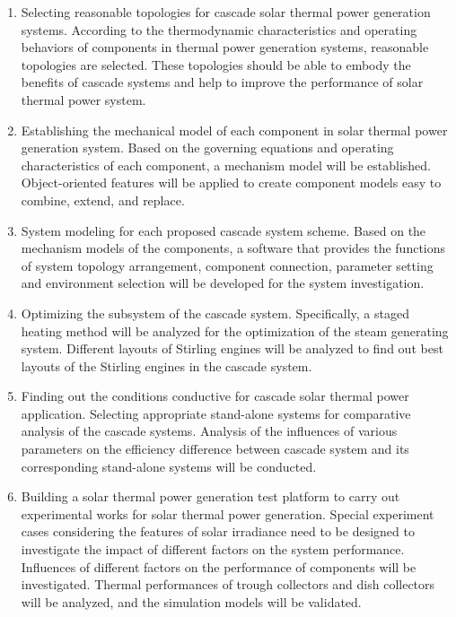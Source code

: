 \begin{enumerate}[label=(\arabic*)]
	
	\item Selecting reasonable topologies for cascade solar thermal power generation systems. According to the thermodynamic characteristics and operating behaviors of components in thermal power generation systems, reasonable topologies are selected. These topologies should be able to embody the benefits of cascade systems and help to improve the performance of solar thermal power system. 

	\item Establishing the mechanical model of each component in solar thermal power generation system. Based on the governing equations and operating characteristics of each component, a mechanism model will be established. Object-oriented features will be applied to create component models easy to combine, extend, and replace.

	\item System modeling for each proposed cascade system scheme. Based on the mechanism models of the components, a software that provides the functions of system topology arrangement, component connection, parameter setting and environment selection will be developed for the system investigation.

	\item Optimizing the subsystem of the cascade system. Specifically, a staged heating method will be analyzed for the optimization of the steam generating system. Different layouts of Stirling engines will be analyzed to find out best layouts of the Stirling engines in the cascade system.

	\item Finding out the conditions conductive for cascade solar thermal power application.  Selecting appropriate stand-alone systems for comparative analysis of the cascade systems. Analysis of the influences of various parameters on the efficiency difference between cascade system and its corresponding stand-alone systems will be conducted.

	\item Building a solar thermal power generation test platform to carry out experimental works for solar thermal power generation. Special experiment cases considering the features of solar irradiance need to be designed to investigate the impact of different factors on the system performance. Influences of different factors on the performance of components will be investigated. Thermal performances of trough collectors and dish collectors will be analyzed, and the simulation models will be validated.
\end{enumerate}
